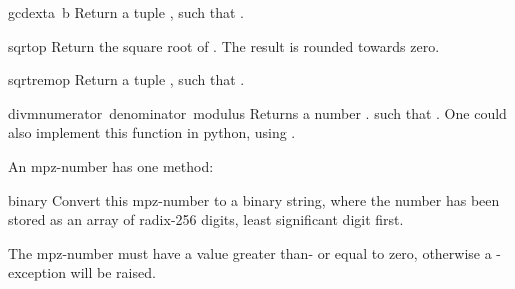 \begin{funcdesc}{gcdext}{a\, b}
  Return a tuple , such that
  .
\end{funcdesc}

\begin{funcdesc}{sqrt}{op}
  Return the square root of . The result is rounded towards zero.
\end{funcdesc}

\begin{funcdesc}{sqrtrem}{op}
  Return a tuple , such that
  .
\end{funcdesc}

\begin{funcdesc}{divm}{numerator\, denominator\, modulus}
  Returns a number . such that
  .
  One could also implement this function in python, using .
\end{funcdesc}

An mpz-number has one method:

\renewcommand{\indexsubitem}{(mpz method)}
\begin{funcdesc}{binary}{}
  Convert this mpz-number to a binary string, where the number has been
  stored as an array of radix-256 digits, least significant digit first.

  The mpz-number must have a value greater than- or equal to zero,
  otherwise a -exception will be raised.
\end{funcdesc}
